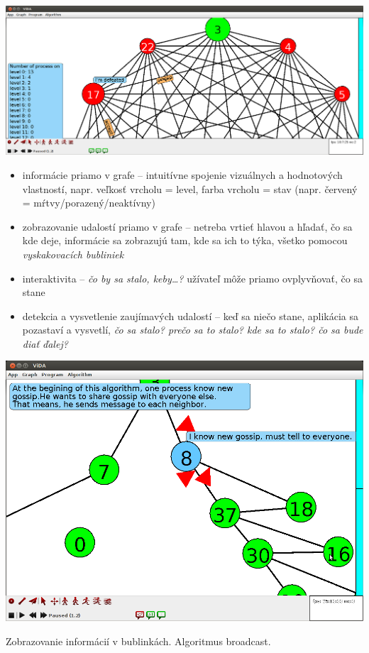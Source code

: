 
\includegraphics[width=\columnwidth]{le}

\begin{itemize}

    \item informácie priamo v grafe -- intuitívne spojenie vizuálnych a hodnotových
    vlastností, napr. veľkosť vrcholu = level, farba vrcholu = stav (napr. červený =
    mŕtvy/porazený/neaktívny)
    \item zobrazovanie udalostí priamo v grafe -- netreba vrtieť hlavou a hľadať, čo sa kde deje,
    informácie sa zobrazujú tam, kde sa ich to týka, všetko pomocou \emph{vyskakovacích bubliniek}
    \item interaktivita -- \emph{čo by sa stalo, keby\dots?} užívateľ môže priamo ovplyvňovať, čo sa
    stane
    \item detekcia a vysvetlenie zaujímavých udalostí -- keď sa niečo stane, aplikácia sa pozastaví
    a vysvetlí, 
    \emph{čo sa stalo? prečo sa to stalo? kde sa to stalo? čo sa bude diať ďalej?}

\end{itemize}


\includegraphics[width=\columnwidth]{bfs}
\caption{Zobrazovanie informácií v bublinkách. Algoritmus broadcast.}

